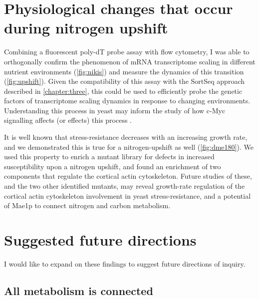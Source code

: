 \section{Physiological changes that occur during nitrogen upshift}

Combining a fluorescent poly-dT probe assay
\parencite{amberg1992isolation} with flow cytometry, I was able to
orthogonally confirm the phenomenon of mRNA transcriptome scaling
in different nutrient environments (\autoref{fig:nikis}) and 
measure the dynamics of this transition (\autoref{fig:upshift}).
Given the compatibility of this assay with the SortSeq approach
described in \autoref{chapter:three}, this could be used to efficiently probe the 
genetic factors of transcriptome scaling dynamics in response to
changing environments. Understanding this process in yeast may
inform the study of how c-Myc signalling affects (or effects) 
this process \parencite{nie2012c}.

It is well known that
stress-resistance decreases with an increasing growth rate,
and we demonstrated this is true for a nitrogen-upshift as well
(\autoref{fig:dme180}).
We used this property to enrich a mutant library for defects in
increased susceptibility upon a nitrogen upshift, and found an
enrichment of two components that regulate the cortical actin 
cytoskeleton. Future studies of these, and the two other identified
mutants, may reveal growth-rate regulation of the cortical actin 
cytoskeleton involvement in yeast stress-resistance, and a potential
of Mae1p to connect nitrogen and carbon metabolism.

\section{Suggested future directions}

I would like to expand on these findings to suggest future 
directions of inquiry.

\subsection{All metabolism is connected}

